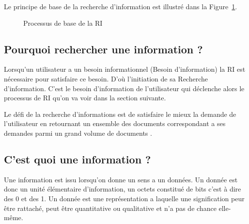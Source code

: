 Le principe de base de la recherche d'information est illustré dans la Figure~\ref{fig:processus-ri}.

\begin{figure}[htbp]
    \begin{center}
    \end{center}
    \caption{Processus de base de la RI \citep{amelioration-ri-approche-semantique}}
    \label{fig:processus-ri}
\end{figure}

\subsection{Pourquoi rechercher une information ?}
Lorsqu'un utilisateur a un besoin informationnel (Besoin d'information) la RI est nécessaire pour satisfaire ce besoin. D'où l'initiation de sa Recherche d'information. C'est le besoin d'information de l'utilisateur qui déclenche alors le processus de RI qu'on va voir dans la section suivante.

Le défi de la recherche d'informations est de satisfaire le mieux la demande de l'utilisateur en retournant un ensemble des documents correspondant a ses demandes parmi un grand volume de documents \citep{amelioration-ri-approche-semantique}.

\subsection{C'est quoi une information ?}
Une information est issu lorsqu'on donne un sens a un données. Un donnée est donc un unité élémentaire d'information, un octets constitué de bits c'est à dire des 0 et des 1. Un donnée est une représentation a laquelle une signification peur être rattaché, peut être quantitative ou qualitative et n'a pas de chance elle-même.

